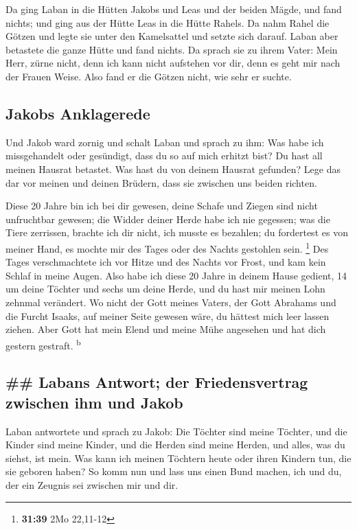  Da ging Laban in die Hütten Jakobs und Leas und der
beiden Mägde, und fand nichts; und ging aus der Hütte Leas in die Hütte
Rahels.  Da nahm Rahel die Götzen und legte sie unter den
Kamelsattel und setzte sich darauf. Laban aber betastete die ganze Hütte
und fand nichts.  Da sprach sie zu ihrem Vater: Mein
Herr, zürne nicht, denn ich kann nicht aufstehen vor dir, denn es geht
mir nach der Frauen Weise. Also fand er die Götzen nicht, wie sehr er
suchte.

\hypertarget{jakobs-anklagerede}{%
\subsection{Jakobs Anklagerede}\label{jakobs-anklagerede}}

 Und Jakob ward zornig und schalt Laban und sprach zu
ihm: Was habe ich missgehandelt oder gesündigt, dass du so auf mich
erhitzt bist?  Du hast all meinen Hausrat betastet. Was
hast du von deinem Hausrat gefunden? Lege das dar vor meinen und deinen
Brüdern, dass sie zwischen uns beiden richten.

 Diese 20 Jahre bin ich bei dir gewesen, deine Schafe und
Ziegen sind nicht unfruchtbar gewesen; die Widder deiner Herde habe ich
nie gegessen;  was die Tiere zerrissen, brachte ich dir
nicht, ich musste es bezahlen; du fordertest es von meiner Hand, es
mochte mir des Tages oder des Nachts gestohlen sein. \footnote{\textbf{31:39}
  2Mo 22,11-12}  Des Tages verschmachtete ich vor Hitze
und des Nachts vor Frost, und kam kein Schlaf in meine Augen.
 Also habe ich diese 20 Jahre in deinem Hause gedient, 14
um deine Töchter und sechs um deine Herde, und du hast mir meinen Lohn
zehnmal verändert.  Wo nicht der Gott meines Vaters, der
Gott Abrahams und die Furcht Isaaks, auf meiner Seite gewesen wäre, du
hättest mich leer lassen ziehen. Aber Gott hat mein Elend und meine Mühe
angesehen und hat dich gestern gestraft. \textsuperscript{b}

\hypertarget{labans-antwort-der-friedensvertrag-zwischen-ihm-und-jakob}{%
\subsection{\#\# Labans Antwort; der Friedensvertrag zwischen ihm und
Jakob}\label{labans-antwort-der-friedensvertrag-zwischen-ihm-und-jakob}}

 Laban antwortete und sprach zu Jakob: Die Töchter sind
meine Töchter, und die Kinder sind meine Kinder, und die Herden sind
meine Herden, und alles, was du siehst, ist mein. Was kann ich meinen
Töchtern heute oder ihren Kindern tun, die sie geboren haben?
 So komm nun und lass uns einen Bund machen, ich und du,
der ein Zeugnis sei zwischen mir und dir.

